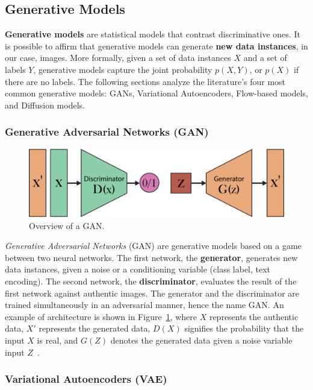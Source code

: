 \documentclass[sn-mathphys,Numbered]{sn-jnl}
\theoremstyle{thmstyleone}%
\theoremstyle{thmstyletwo}%
\theoremstyle{thmstylethree}%
\begin{document}
\subsection{Generative Models}\label{sec:imggenmodels}
\textbf{Generative models} are statistical models that contrast discriminative ones. 
It is possible to affirm that generative models can generate \textbf{new data instances}, 
in our case, images. 
More formally, given a set of data instances $X$ and a set of labels $Y$, 
generative models capture the joint probability $p(X, Y)$, or $p(X)$ if there are no labels. 
The following sections  analyze the literature's four most common generative models: GANs, Variational Autoencoders, Flow-based models, and Diffusion models.


\subsubsection{Generative Adversarial Networks (GAN)}\label{sec:gan}

\begin{figure}[b]
	\centering
    \includegraphics[scale=0.8]{img/svg/GAN.png}
	\caption{Overview of a GAN.}\label{fig:gan}
\end{figure}

\emph{Generative Adversarial Networks} (GAN) \cite{goodfellow2014generative} are generative models based on a game between two neural networks. 
The first network, the \textbf{generator}, generates new data instances, given a noise or a conditioning variable (class label, text encoding). 
The second network, the \textbf{discriminator}, evaluates the result of the first network against authentic images.
The generator and the discriminator are trained simultaneously in an adversarial manner, hence the name GAN. An example of architecture is shown in Figure~\ref{fig:gan}, where $X$ represents the authentic data, $X'$ represents the generated data, $D(X)$ signifies the probability that the input $X$ is real, and $G(Z)$ denotes the generated data given a noise variable input $Z$~\cite{weng2019gan}.

\subsubsection{Variational Autoencoders (VAE)}\label{sec:vae}
\end{document}
